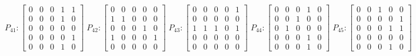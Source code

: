     $$
        P_{41} : \begin{bmatrix}
            0 & 0 & 0 & 1 & 1 \\
            0 & 0 & 0 & 1 & 0 \\
            0 & 0 & 0 & 0 & 0 \\
            0 & 0 & 0 & 0 & 1 \\
            0 & 0 & 0 & 1 & 0
        \end{bmatrix}
        \;
         P_{42} : \begin{bmatrix}
            0 & 0 & 0 & 0 & 0 \\
            1 & 1 & 0 & 0 & 0 \\
            0 & 0 & 0 & 1 & 0 \\
            1 & 0 & 0 & 0 & 1 \\
            0 & 0 & 0 & 0 & 0
        \end{bmatrix}
        \;
        P_{43} : \begin{bmatrix}
            0 & 0 & 0 & 0 & 1 \\
            0 & 0 & 0 & 0 & 0 \\
            1 & 1 & 1 & 0 & 1 \\
            0 & 0 & 0 & 0 & 0 \\
            0 & 0 & 0 & 0 & 0
        \end{bmatrix}
        \;
        P_{44} : \begin{bmatrix}
            0 & 0 & 0 & 1 & 0 \\
            0 & 0 & 1 & 0 & 0 \\
            0 & 1 & 0 & 0 & 0 \\
            0 & 0 & 0 & 1 & 0 \\
            0 & 0 & 0 & 1 & 0
        \end{bmatrix}
        \;
        P_{45} : \begin{bmatrix}
            0 & 0 & 1 & 0 & 0 \\
            0 & 0 & 0 & 0 & 1 \\
            0 & 0 & 0 & 1 & 1 \\
            0 & 0 & 0 & 0 & 0 \\
            0 & 0 & 0 & 1 & 0
        \end{bmatrix}
    $$

